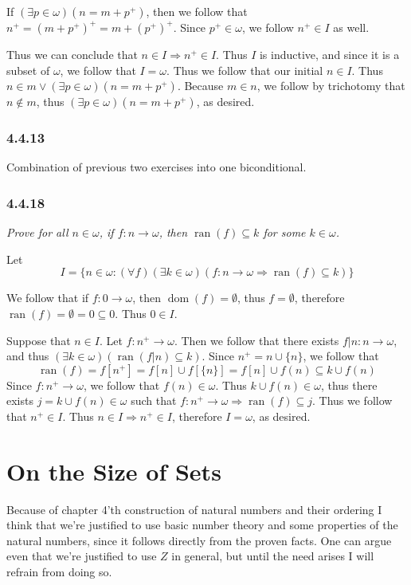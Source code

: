 \documentclass[11pt,oneside,titlepage]{book}
\DeclareMathOperator \ra {\Rightarrow}
\DeclareMathOperator \dom {dom}
\DeclareMathOperator \ran {ran}
\begin{document}
If $(\exists p \in \omega)(n = m + p^+)$, then we follow that $n^+ = (m + p^+)^+ = m + (p^+)^+$.
Since $p^+ \in \omega$, we follow $n^+ \in I$ as well.

Thus we can conclude that $n \in I \ra n^+ \in I$. Thus $I$ is inductive, and since it is
a subset of $\omega$, we follow that $I = \omega$. Thus we follow that our initial $n \in I$.
Thus $n \in m \lor (\exists p \in \omega)(n = m + p^+)$. Because $m \in n$, we follow
by trichotomy that $n \notin m$, thus $ (\exists p \in \omega)(n = m + p^+)$, as desired.

\subsection*{4.4.13}

Combination of previous two exercises into one biconditional.

\subsection*{4.4.18}

\textit{Prove for all $n \in \omega$, if $f: n \to \omega$, then $\ran(f) \subseteq k$ for
  some $k \in \omega$.}


Let
$$I = \{n \in \omega: (\forall f)
(\exists k \in \omega)(f: n \to \omega \ra \ran(f) \subseteq k)\}$$

We follow that if $f: 0 \to \omega$, then $\dom(f) = \emptyset$, thus $f = \emptyset$, therefore
$\ran(f) = \emptyset = 0 \subseteq 0$. Thus $0 \in I$.

Suppose that $n \in I$. Let $f: n^+ \to \omega$. Then we follow that
there exists $f|n: n \to \omega$, and thus $(\exists k \in \omega)(\ran(f|n) \subseteq k)$.
Since $n^+ = n \cup \{n\}$, we follow that
$$\ran(f) = f[n^+] = f[n] \cup f[\{n\}] = f[n] \cup f(n) \subseteq k \cup f(n)$$
Since $f: n^+ \to \omega$, we follow that $f(n) \in \omega$. Thus $k \cup f(n) \in \omega$,
thus there exists $j = k \cup f(n) \in \omega$ such that
$f: n^+ \to \omega \ra \ran(f) \subseteq j$. Thus we follow that $n^+ \in I$.
Thus $n \in I \ra n^+ \in I$, therefore $I = \omega$, as desired.


\chapter{On the Size of Sets}

Because of chapter 4'th construction of natural numbers and their ordering I think
that we're justified to use basic number theory and some properties of the
natural numbers, since it follows directly from the proven facts.
One can argue even that we're justified to use $Z$ in general, but until
the need arises I will refrain from doing so.
\end{document}
